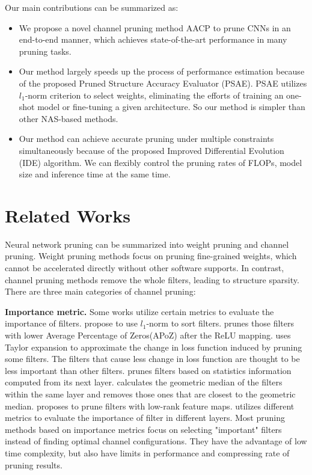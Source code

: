 \documentclass[final]{cvpr}
\begin{document}
Our main contributions can be summarized as:
\begin{itemize}
\item We propose a novel channel pruning method AACP to prune CNNs in an end-to-end manner, which achieves state-of-the-art 
performance in many pruning tasks.
\item Our method largely speeds up the process of performance estimation because of the proposed Pruned Structure Accuracy Evaluator (PSAE). 
PSAE utilizes $l_1$-norm criterion to select weights, eliminating the efforts of training an one-shot model or fine-tuning a given architecture. 
So our method is simpler than other NAS-based methods.
\item Our method can achieve accurate pruning under multiple constraints simultaneously because of the proposed Improved Differential Evolution (IDE) 
algorithm. We can flexibly control the pruning rates of FLOPs, model size and inference time at the same time.
\end{itemize}    

\section{Related Works}
Neural network pruning can be summarized into weight pruning and channel pruning. Weight pruning methods \cite{lecun1990optimal,han2015deep}
focus on pruning fine-grained weights, which cannot be accelerated directly without other software supports. In contrast, channel 
pruning methods remove the whole filters, leading to structure sparsity. There are three main categories of channel pruning:

\textbf{Importance metric.} Some works utilize certain metrics to evaluate the importance of filters. \cite{li2016pruning,he2018soft} propose to use $l_1$-norm to sort filters. 
\cite{hu2016network} prunes those filters 
with lower Average Percentage of Zeros(APoZ) after the ReLU mapping. \cite{molchanov2016pruning} uses Taylor expansion to approximate 
the change in loss function induced by pruning some filters. The filters that cause less change in loss function are thought to be less important 
than other filters. \cite{luo2017thinet} prunes filters based on statistics information computed from its next layer. \cite{he2019filter} 
calculates the geometric median of the filters within the same layer and 
removes those ones that are closest to the geometric median. \cite{lin2020hrank} proposes to prune filters with low-rank feature maps. 
\cite{he2020learning} utilizes different metrics to evaluate the importance of filter in different layers. Most pruning methods based on 
importance metrics focus on selecting "important" filters instead of finding optimal channel configurations. They have the advantage of low 
time complexity, but also have limits in performance and compressing rate of pruning results. 
\end{document}
